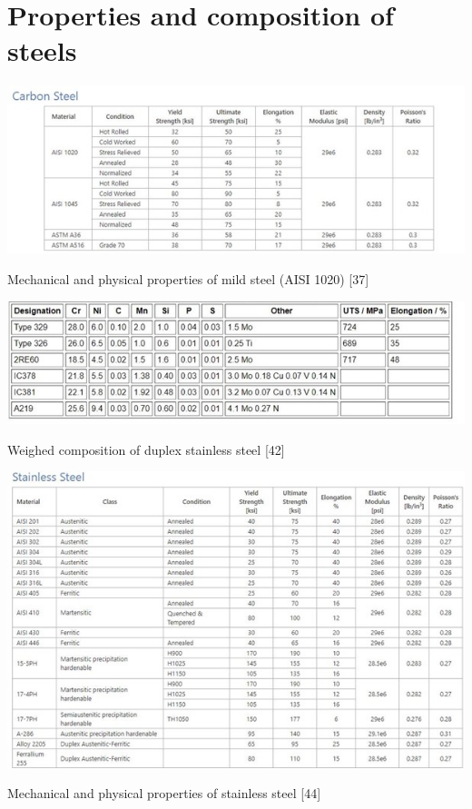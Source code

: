 \documentclass[12pt]{report}
\begin{document}
\chapter{Properties and composition of steels}
\begin{table}[H]
    \centering
    \includegraphics[width=\textwidth]{mechanical_and_physical_properties_of_mild_steel.jpg}
    \caption{Mechanical and physical properties of mild steel (AISI 1020) [37]}
\end{table}

\begin{table}[H]
    \centering
    \includegraphics[width=\textwidth]{weighed_composition_of_duplex_stainless_steel.jpg}
    \caption{Weighed composition of duplex stainless steel [42]}
\end{table}

\begin{table}[H]
    \centering
    \includegraphics[width=\textwidth]{mechanical_and_physical_properties_of_stainless_steel.jpg}
    \caption{Mechanical and physical properties of stainless steel [44]}
\end{table}
\end{document}
